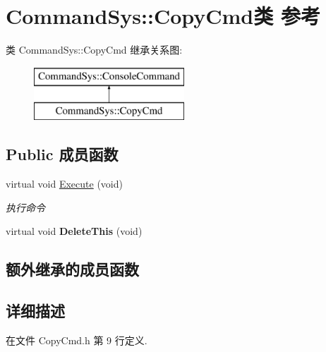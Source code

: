 \hypertarget{class_command_sys_1_1_copy_cmd}{\section{Command\-Sys\-:\-:Copy\-Cmd类 参考}
\label{class_command_sys_1_1_copy_cmd}
}
类 Command\-Sys\-:\-:Copy\-Cmd 继承关系图\-:\begin{figure}[H]
\begin{center}
\leavevmode
\includegraphics[height=2.000000cm]{class_command_sys_1_1_copy_cmd}
\end{center}
\end{figure}
\subsection*{Public 成员函数}
\begin{DoxyCompactItemize}
\item 
virtual void \hyperlink{class_command_sys_1_1_copy_cmd_a4b094e7c2d79541444b0ee561b2b7464}{Execute} (void)
\begin{DoxyCompactList}\small\item\em 执行命令 \end{DoxyCompactList}\item 
\hypertarget{class_command_sys_1_1_copy_cmd_a34f98b273c2159aeea376c59d99a6809}{virtual void {\bfseries Delete\-This} (void)}\label{class_command_sys_1_1_copy_cmd_a34f98b273c2159aeea376c59d99a6809}

\end{DoxyCompactItemize}
\subsection*{额外继承的成员函数}


\subsection{详细描述}


在文件 Copy\-Cmd.\-h 第 9 行定义.



